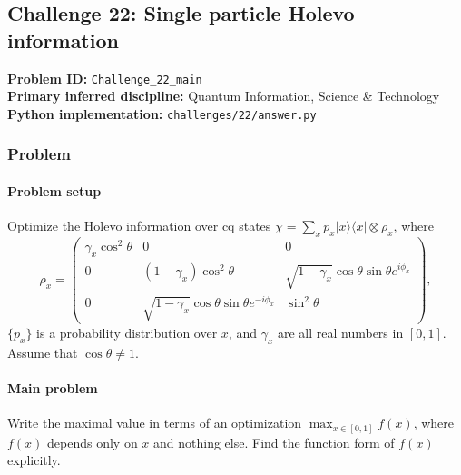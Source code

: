 \subsection[Challenge 22: Single particle Holevo information]{Challenge 22: Single particle Holevo information}
\textbf{Problem ID:} \texttt{Challenge\_22\_main}\\
\textbf{Primary inferred discipline:} Quantum Information, Science \& Technology\\
\textbf{Python implementation:} \texttt{challenges/22/answer.py}

\subsubsection*{Problem}
\paragraph*{Problem setup}

Optimize the Holevo information over cq states $\chi=\sum_x p_x|x\rangle\langle x|\otimes\rho_x$, where
\begin{equation}
\rho_x=\left(\begin{array}{ccc}
\gamma_x \cos ^2 \theta & 0 & 0 \\
0 & \left(1-\gamma_x\right) \cos ^2 \theta & \sqrt{1-\gamma_x} \cos \theta \sin \theta e^{i \phi_x} \\
0 & \sqrt{1-\gamma_x} \cos \theta \sin \theta e^{-i \phi_x} & \sin ^2 \theta
\end{array}\right),
\end{equation}
$\{p_x\}$ is a probability distribution over $x$, and $\gamma_x$ are all real numbers in $[0,1]$. Assume that $\cos\theta\neq1$.


\paragraph*{Main problem}

Write the maximal value in terms of an optimization $\max_{x\in[0,1]} f(x)$, where $f(x)$ depends only on $x$ and nothing else. Find the function form of $f(x)$ explicitly.


